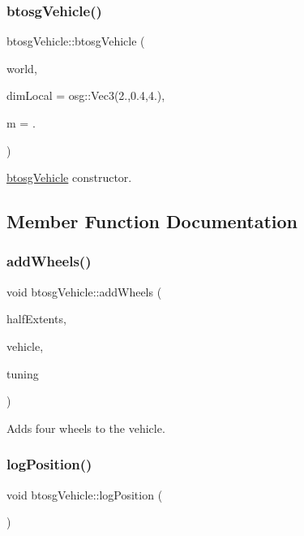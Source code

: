 \subsubsection{\texorpdfstring{btosg\+Vehicle()}{btosgVehicle()}}
{\footnotesize\ttfamily btosg\+Vehicle\+::btosg\+Vehicle (\begin{DoxyParamCaption}\item[{\hyperlink{classbtosgWorld}{btosg\+World} $\ast$}]{world,  }\item[{osg\+::\+Vec3}]{dim\+Local = {\ttfamily osg\+:\+:Vec3(2.,0.4,4.)},  }\item[{double}]{m = {.} }\end{DoxyParamCaption})\hspace{0.3cm}{\ttfamily [inline]}}

\hyperlink{classbtosgVehicle}{btosg\+Vehicle} constructor. 

\subsection{Member Function Documentation}
\mbox{\label{classbtosgVehicle_a98971fb952c08cb72341a0c333fc66de}} 
\subsubsection{\texorpdfstring{add\+Wheels()}{addWheels()}}
{\footnotesize\ttfamily void btosg\+Vehicle\+::add\+Wheels (\begin{DoxyParamCaption}\item[{bt\+Vector3 $\ast$}]{half\+Extents,  }\item[{bt\+Raycast\+Vehicle $\ast$}]{vehicle,  }\item[{bt\+Raycast\+Vehicle\+::bt\+Vehicle\+Tuning}]{tuning }\end{DoxyParamCaption})\hspace{0.3cm}{\ttfamily [inline]}}

Adds four wheels to the vehicle. \mbox{\label{classbtosgVehicle_ae9168c62263b26f95d068d94d6a7cab7}} 
\subsubsection{\texorpdfstring{log\+Position()}{logPosition()}}
{\footnotesize\ttfamily void btosg\+Vehicle\+::log\+Position (\begin{DoxyParamCaption}{ }\end{DoxyParamCaption})\hspace{0.3cm}{\ttfamily [inline]}}

